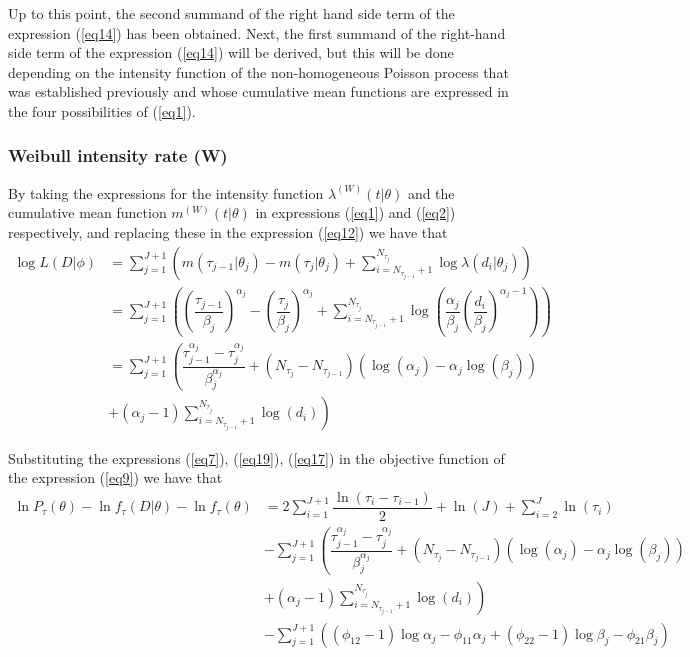 \documentclass[APA,STIX1COL]{WileyNJD-v2}
\begin{document}
Up to this point, the second summand of the right hand side term of the expression (\ref{eq14}) has been obtained. Next, the first summand of the right-hand side term of the expression (\ref{eq14}) will be derived, but this will be done depending on the intensity function of the non-homogeneous Poisson process that was established previously and whose cumulative mean functions are expressed in the four possibilities of (\ref{eq1}).\\



\subsubsection{Weibull intensity rate (W)}
\label{Weibull}

By taking the expressions for the intensity function $\lambda^{(W)}(t|\theta)$ and the cumulative mean function $m^{(W)}(t|\theta)$ in expressions (\ref{eq1}) and (\ref{eq2}) respectively, and replacing these in the expression (\ref{eq12}) we have that 
\begin{align}%
	\label{eq19}
	\log L(D|\phi)&=\sum_{j=1}^{J+1} \left(  m(\tau_{j-1}|\theta_j)-m(\tau_j|\theta_j)+\sum_{i= N_{\tau_{j-1}}+1}^{ N_{\tau_j}} \log\lambda(d_i|\theta_j)   \right)\nonumber\\
	&=\sum_{j=1}^{J+1} \left(\left(\dfrac{\tau_{j-1}}{\beta_j}\right)^{\alpha_j}-\left(\dfrac{\tau_{j}}{\beta_j}\right)^{\alpha_j}+\sum_{i= N_{\tau_{j-1}}+1}^{ N_{\tau_j}} \log\left(\dfrac{\alpha_j}{\beta_j} \left(\dfrac{d_i}{\beta_j}\right)^{\alpha_j-1}\right)\right)\nonumber\\
	&=\sum_{j=1}^{J+1} \left( \dfrac{\tau_{j-1}^{\alpha_j}-\tau_{j}^{\alpha_j}}{\beta_j^{\alpha_j}} + (N_{\tau_j}-N_{\tau_{j-1}})\left(\log(\alpha_j)- \alpha_j\log(\beta_j)\right)\right.\nonumber\\
	 &\left.+ (\alpha_j-1)\sum_{i= N_{\tau_{j-1}}+1}^{ N_{\tau_j}}\log (d_i)\right)
\end{align}

Substituting the expressions (\ref{eq7}), (\ref{eq19}), (\ref{eq17}) in the objective function of the expression (\ref{eq9}) we have that \\
\begin{align}
	\label{eq20}
	\ln P_{\tau}(\theta) - \ln f_\tau(D|\theta) - \ln f_\tau(\theta)
	&= 2\sum_{i=1}^{J+1}\dfrac{\ln(\tau_i-\tau_{i-1})}{2}+  \ln(J) + \sum_{i=2}^J\ln(\tau_i)\nonumber\\
	&-\sum_{j=1}^{J+1} \left(\dfrac{\tau_{j-1}^{\alpha_j}-\tau_{j}^{\alpha_j}}{\beta_j^{\alpha_j}} + (N_{\tau_j}-N_{\tau_{j-1}})\left(\log(\alpha_j)- \alpha_j\log(\beta_j)\right) \right.\nonumber\\
	&\left.+ (\alpha_j-1)\sum_{i= N_{\tau_{j-1}}+1}^{ N_{\tau_j}}\log (d_i)\right)\nonumber\\
	&-\sum_{j=1}^{J+1} \left((\phi_{12}-1)\log\alpha_j - \phi_{11}\alpha_j + (\phi_{22}-1)\log\beta_j - \phi_{21}\beta_j\right)
\end{align}
\\
\end{document}
